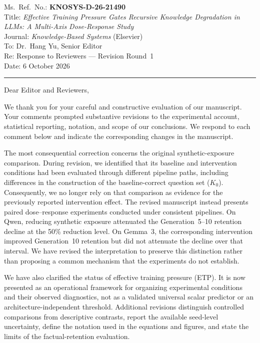 \documentclass[11pt,a4paper]{article}
\begin{document}
\noindent
Ms.\ Ref.\ No.: \textbf{KNOSYS-D-26-21490}\\[2pt]
Title: \textit{Effective Training Pressure Gates Recursive Knowledge
Degradation in LLMs: A Multi-Axis Dose-Response Study}\\[2pt]
Journal: \textit{Knowledge-Based Systems} (Elsevier)\\[2pt]
To: Dr.\ Hang Yu, Senior Editor\\[2pt]
Re: Response to Reviewers --- Revision Round~1\\[2pt]
Date: 6 October 2026

\bigskip
\medskip\noindent\rule{\linewidth}{0.4pt}\medskip

\noindent
Dear Editor and Reviewers,

We thank you for your careful and constructive evaluation of our manuscript.
Your comments prompted substantive revisions to the experimental account,
statistical reporting, notation, and scope of our conclusions. We respond to
each comment below and indicate the corresponding changes in the manuscript.

The most consequential correction concerns the original synthetic-exposure
comparison. During revision, we identified that its baseline and intervention
conditions had been evaluated through different pipeline paths, including
differences in the construction of the baseline-correct question set
($K_0$). Consequently, we no longer rely on that comparison as evidence for
the previously reported intervention effect. The revised manuscript instead
presents paired dose--response experiments conducted under consistent
pipelines. On Qwen, reducing synthetic exposure attenuated the
Generation~5--10 retention decline at the 50\% reduction level. On Gemma~3,
the corresponding intervention improved Generation~10 retention but did not
attenuate the decline over that interval. We have revised the interpretation
to preserve this distinction rather than proposing a common mechanism that
the experiments do not establish.

We have also clarified the status of effective training pressure (ETP). It is
now presented as an operational framework for organizing experimental
conditions and their observed diagnostics, not as a validated universal
scalar predictor or an architecture-independent threshold. Additional
revisions distinguish controlled comparisons from descriptive contrasts,
report the available seed-level uncertainty, define the notation used in the
equations and figures, and state the limits of the factual-retention
evaluation.
\end{document}
